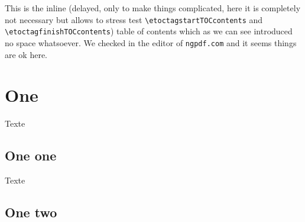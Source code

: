 \documentclass{article}
\begin{document}
\def\foo{}
\makeatletter
\let\protectededef\protected@edef
\let\protectedxdef\protected@xdef
\makeatother

   {\etocskipfirstprefix}
   {\protectedxdef\foo{\foo; }}
   {\protectedxdef\foo{\foo
                       \etocthetocitembegintag
                       \etoctagReference{\etocthelinkedname}%
                       \etocthetocitemendtag}%
    }
   {}

   {\protectedxdef\foo{\foo\space(}\etocskipfirstprefix}
   {\protectedxdef\foo{\foo, }}
   {\protectedxdef\foo{\foo
                       \etocthetocitembegintag
                       \etoctagReference{\etocthelinkedname}%
                       \etocthetocitemendtag}%
    }
   {\protectedxdef\foo{\foo)}}

\etocsettocstyle
   {\etoctaggingoff
    \gdef\foo{\etoctagstartTOCcontents}}
   {\protectedxdef\foo{\foo\etoctagfinishTOCcontents}}

\tableofcontents


This is the inline (delayed, only to make things complicated, here it is
completely not necessary but allows to stress test
\verb|\etoctagstartTOCcontents| and \verb|\etoctagfinishTOCcontents|)%
\foo
table of contents which as we can see introduced no space whatsoever.
We checked in the editor of \texttt{ngpdf.com} and it seems things are ok
here.

\section{One}

Texte

\subsection{One one}

Texte

\subsection{One two}
\end{document}
